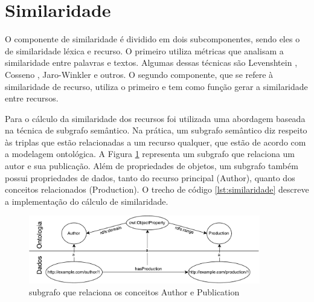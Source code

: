 \section{Similaridade}
O componente de similaridade é dividido em dois subcomponentes, sendo eles o de similaridade léxica e recurso. O primeiro utiliza métricas que analisam a similaridade entre palavras e textos. Algumas dessas técnicas são Levenshtein \cite{levenshtein1966binary}, Cosseno \cite{singhal2001modern}, Jaro-Winkler \cite{winkler1990string} e outros. O segundo componente, que se refere à similaridade de recurso, utiliza o primeiro e tem como função gerar a similaridade entre recursos.

Para o cálculo da similaridade dos recursos foi utilizada uma abordagem baseada na técnica de subgrafo semântico. Na prática, um subgrafo semântico diz respeito às triplas que estão relacionadas a um recurso qualquer, que estão de acordo com a modelagem ontológica. A Figura \ref{fig:subgrafo} representa um subgrafo que relaciona um autor e sua publicação. Além de propriedades de objetos, um subgrafo também possui propriedades de dados, tanto do recurso principal (Author), quanto dos conceitos relacionados (Production). O trecho de código \ref{lst:similaridade} descreve a implementação do cálculo de similaridade.

\begin{figure}[!ht]
	\centering
	\includegraphics[width=0.9\textwidth]{./imagens/subgrafo_semantico.pdf}
    \caption{subgrafo que relaciona os conceitos Author e Publication}
	\label{fig:subgrafo}
\end{figure}

